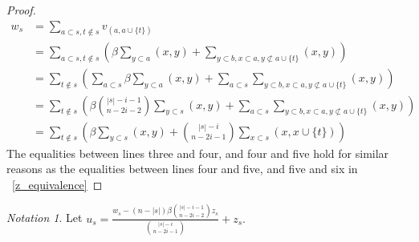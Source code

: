 \documentclass[10 pt]{amsart}
\theoremstyle{plain}
\theoremstyle{definition}
\theoremstyle{remark}
\newtheorem{note}[thm]{Notation}
\numberwithin{equation}{section}
\begin{document}
\begin{proof}
\begin{align*}
	w_s &= \sum_{a \subset s,t\notin s}^{}v_{(a, a \cup \{t\})}\\
	&= \sum_{a \subset s,t\notin s}^{}\left(\beta \sum_{y \subset a}^{}(x, y) + \sum_{y\subset b,x \subset a,y\not\subset a \cup \{t\}}^{}(x, y) \right)\\
	&= \sum_{t\notin s}^{}\left(\sum_{a \subset s}^{}\beta \sum_{y \subset a}^{}(x, y) + \sum_{a \subset s}^{}\sum_{y\subset b,x \subset a,y\not\subset a \cup \{t\}}^{}(x, y) \right)\\
	&=\sum_{t\notin s}^{}\left(\beta \binom {|s|-i-1}{n-2i-2}\sum_{y \subset s}^{}(x, y) + \sum_{a \subset s}^{}\sum_{y\subset b,x \subset a,y\not\subset a \cup \{t\}}^{}(x, y) \right)\\
	&=\sum_{t\notin s}^{} \left(\beta \sum_{y \subset s}^{}(x, y) + \binom {|s|-i}{n-2i-1}\sum_{x \subset s}^{}(x, x \cup \{t\}) \right)
\end{align*}
The equalities between lines three and four, and four and five hold for similar reasons as the equalities between lines four and five, and five and six in ~\ref{z_equivalence}
\end{proof}

\begin{note}
Let $u_s = \frac{w_s - (n - |s|)\beta \binom {|s|-i-1}{n-2i-2} z_s}{\binom {|s|-i}{n-2i-1}} + z_s.$
\end{note}
\end{document}
